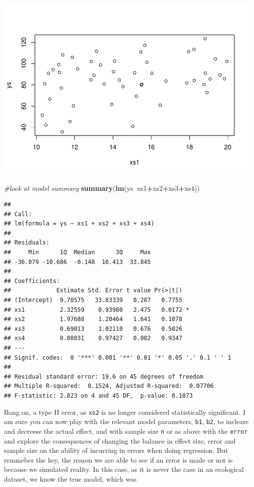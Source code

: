 \documentclass[
]{book}
\newenvironment{Shaded}{\begin{snugshade}}{\end{snugshade}}
\newcommand{\CommentTok}[1]{\textcolor[rgb]{0.56,0.35,0.01}{\textit{#1}}}
\newcommand{\KeywordTok}[1]{\textcolor[rgb]{0.13,0.29,0.53}{\textbf{#1}}}
\newcommand{\NormalTok}[1]{#1}
\newcommand{\OperatorTok}[1]{\textcolor[rgb]{0.81,0.36,0.00}{\textbf{#1}}}
\begin{document}
\includegraphics{ECOMODbook_files/figure-latex/a7.7-1.pdf}

\begin{Shaded}
\begin{Highlighting}[]
\CommentTok{#look at model summary}
\KeywordTok{summary}\NormalTok{(}\KeywordTok{lm}\NormalTok{(ys}\OperatorTok{~}\NormalTok{xs1}\OperatorTok{+}\NormalTok{xs2}\OperatorTok{+}\NormalTok{xs3}\OperatorTok{+}\NormalTok{xs4))}
\end{Highlighting}
\end{Shaded}

\begin{verbatim}
## 
## Call:
## lm(formula = ys ~ xs1 + xs2 + xs3 + xs4)
## 
## Residuals:
##     Min      1Q  Median      3Q     Max 
## -36.079 -10.686  -0.148  16.413  33.845 
## 
## Coefficients:
##             Estimate Std. Error t value Pr(>|t|)  
## (Intercept)  9.70575   33.83339   0.287   0.7755  
## xs1          2.32559    0.93980   2.475   0.0172 *
## xs2          1.97688    1.20464   1.641   0.1078  
## xs3          0.69013    1.02110   0.676   0.5026  
## xs4          0.08031    0.97427   0.082   0.9347  
## ---
## Signif. codes:  0 '***' 0.001 '**' 0.01 '*' 0.05 '.' 0.1 ' ' 1
## 
## Residual standard error: 19.6 on 45 degrees of freedom
## Multiple R-squared:  0.1524,	Adjusted R-squared:  0.07706 
## F-statistic: 2.023 on 4 and 45 DF,  p-value: 0.1073
\end{verbatim}

Bang on, a type II error, as \texttt{xs2} is no longer considered statistically significant. I am sure you can now play with the relevant model parameters, \texttt{b1}, \texttt{b2}, to incleare and decreese the actual effect, and with sample size \texttt{n} or as above with the \texttt{error} and explore the consequences of changing the balance in effect size, error and sample size on the ability of incurring in errors when doing regression. But remmeber the key, the reason we are able to see if an error is made or not is because we simulated reality. In this case, as it is never the case in an ecological dataset, we know the true model, which was
\end{document}
